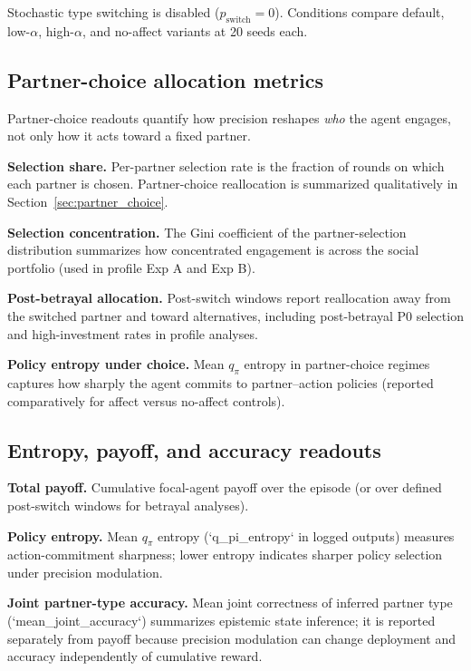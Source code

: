 Stochastic type switching is disabled ($p_{\mathrm{switch}}=0$). Conditions compare default, low-$\alpha$, high-$\alpha$, and no-affect variants at 20 seeds each.

\subsection{Partner-choice allocation metrics}

Partner-choice readouts quantify how precision reshapes \emph{who} the agent engages, not only how it acts toward a fixed partner.

\textbf{Selection share.} Per-partner selection rate is the fraction of rounds on which each partner is chosen. Partner-choice reallocation is summarized qualitatively in Section~\ref{sec:partner_choice}.

\textbf{Selection concentration.} The Gini coefficient of the partner-selection distribution summarizes how concentrated engagement is across the social portfolio (used in profile Exp A and Exp B).

\textbf{Post-betrayal allocation.} Post-switch windows report reallocation away from the switched partner and toward alternatives, including post-betrayal P0 selection and high-investment rates in profile analyses.

\textbf{Policy entropy under choice.} Mean $q_\pi$ entropy in partner-choice regimes captures how sharply the agent commits to partner--action policies (reported comparatively for affect versus no-affect controls).

\subsection{Entropy, payoff, and accuracy readouts}

\textbf{Total payoff.} Cumulative focal-agent payoff over the episode (or over defined post-switch windows for betrayal analyses).

\textbf{Policy entropy.} Mean $q_\pi$ entropy (`q\_pi\_entropy` in logged outputs) measures action-commitment sharpness; lower entropy indicates sharper policy selection under precision modulation.

\textbf{Joint partner-type accuracy.} Mean joint correctness of inferred partner type (`mean\_joint\_accuracy`) summarizes epistemic state inference; it is reported separately from payoff because precision modulation can change deployment and accuracy independently of cumulative reward.


